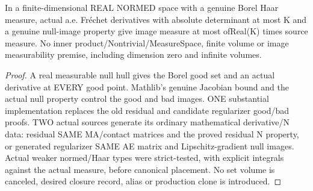 \begin{lemma}
  \label{lem:ae-jacobian-image-upper}
  \leanok
  In a finite-dimensional REAL NORMED space with a genuine Borel Haar measure,
  actual a.e. Fr\'echet derivatives with absolute determinant at most K and a
  genuine null-image property give image measure at most ofReal(K) times
  source measure. No inner product/Nontrivial/MeasureSpace, finite volume or
  image measurability premise, including dimension zero and infinite volumes.
\end{lemma}
\begin{proof}
  \leanok
  A real measurable null hull gives the Borel good set and an actual derivative
  at EVERY good point. Mathlib's genuine Jacobian bound and the actual null
  property control the good and bad images. ONE substantial implementation
  replaces the old residual and candidate regularizer good/bad proofs. TWO
  actual sources generate its ordinary mathematical derivative/N data:
  residual SAME MA/contact matrices and the proved residual N property, or
  generated regularizer SAME AE matrix and Lipschitz-gradient null images.
  Actual weaker normed/Haar types were strict-tested, with explicit integrals
  against the actual measure, before canonical placement. No set volume is
  canceled, desired closure record, alias or production clone is introduced.
\end{proof}


